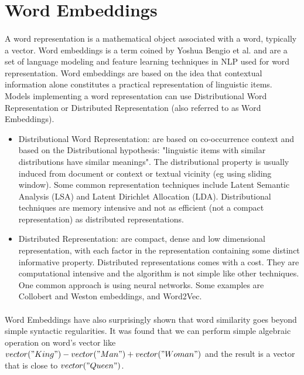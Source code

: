 \nocite{sebastianruder}
\section{Word Embeddings}
\paragraph{}
A word representation is a mathematical object associated with a word, typically a vector. Word embeddings is a term coined by Yoshua Bengio et al. and are a set of language modeling and feature learning techniques in NLP used for word representation. Word embeddings are based on the idea that contextual information alone constitutes a practical representation of linguistic items. Models implementing a word representation can use Distributional Word Representation or Distributed Representation (also referred to as Word Embeddings).

\begin{itemize}[itemsep = 0.1em]
\item Distributional Word Representation: are based on co-occurrence context and based on the Distributional hypothesis:  "linguistic items with similar distributions have similar meanings". The distributional property is usually induced from document or context or textual vicinity (eg using sliding window). Some common representation techniques include Latent Semantic Analysis (LSA) and Latent Dirichlet Allocation (LDA). Distributional techniques are memory intensive and not as efficient (not a compact representation) as distributed representations.
\item Distributed Representation: are compact, dense and low dimensional representation, with each factor in the representation containing some distinct informative property. Distributed representations comes with a cost. They are computational intensive and the algorithm is not simple like other techniques. One common approach is using neural networks. Some examples are Collobert and Weston embeddings, and Word2Vec.
\end{itemize}

\paragraph{}
Word Embeddings have also surprisingly shown that word similarity goes beyond simple syntactic regularities. It was found that we can perform simple algebraic operation on word's vector like \(vector("King")-vector("Man")+vector("Woman")\) and the result is a vector that is close to \(vector("Queen")\).

